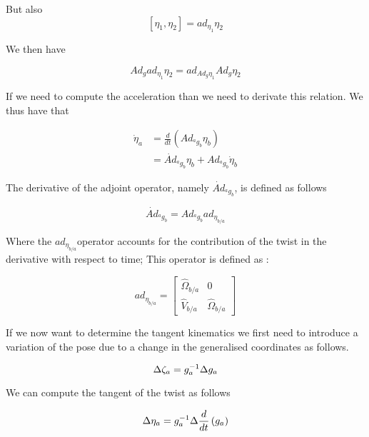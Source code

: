 \documentclass[12pt,a4paper]{book}
\newcommand{\agb}{\ensuremath{{^a g _b}}}
\newcommand{\etaa}{\ensuremath{{\eta_{a}}}}
\newcommand{\etab}{\ensuremath{{\eta_{b}}}}
\newcommand{\etaba}{\ensuremath{{\eta_{b/a}}}}
\newcommand{\dotetaa}{\ensuremath{{\dot{\eta}_{a}}}}
\newcommand{\dotetab}{\ensuremath{{\dot{\eta}_{b}}}}
\newcommand{\Adagb}{\ensuremath{Ad_{\agb}}}
\newcommand{\dotAdagb}{\ensuremath{\dot{Ad}_{\agb}}}
\newcommand{\adetaba}{\ensuremath{ad_{\etaba}}}
\begin{document}
But also 
\begin{equation}
	\left[\eta_1, \eta_2 \right] = ad_{\eta_1} \eta_2
\end{equation}

We then have

\begin{equation}\label{eq:property1}
	Ad_g ad_{\eta_1} \eta_2 =  ad_{Ad_g \eta_1} Ad_g \eta_2
\end{equation}


If we need to compute the acceleration than we need to derivate this relation. We thus have that 

\begin{equation}
\begin{aligned}
	\dotetaa 	&= \frac{d}{dt}\left( \Adagb \etab \right) \\
				&= \dotAdagb \etab + \Adagb \dotetab
\end{aligned}
\end{equation}

The derivative of the adjoint operator, namely \dotAdagb{}, is defined as follows

\begin{equation}\label{eq:derivative Ad time}
	\dotAdagb = \Adagb \adetaba
\end{equation}

Where the \adetaba operator accounts for the contribution of the twist in the derivative with respect to time; This operator is defined as :

\begin{equation}
	\adetaba = 
	\begin{bmatrix}
		\hat{\Omega}_{b/a}	&	0 \\
		\hat{V}_{b/a}			&	\hat{\Omega}_{b/a}
	\end{bmatrix}
\end{equation}


If we now want to determine the tangent kinematics we first need to introduce a variation of the pose due to a change in the generalised coordinates as follows.

\begin{equation}\label{eq: Delta zeta}
	\Delta \zeta_{a} = g_a ^{-1} \Delta g_a
\end{equation}


We can compute the tangent of the twist as follows

\begin{equation}
	\Delta \etaa = g_a \inv \Delta \frac{d}{dt}\left(g_a \right)
\end{equation}
\end{document}
